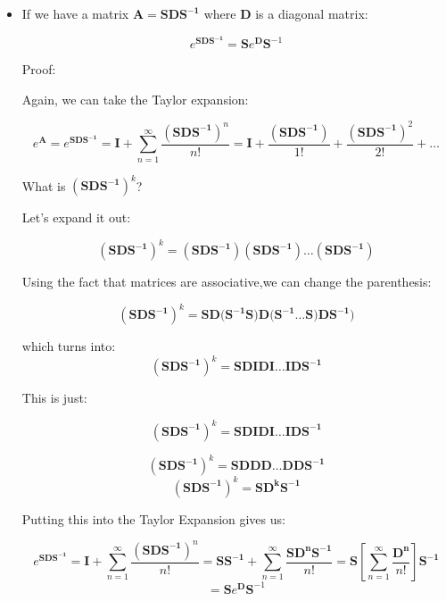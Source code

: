 \documentclass{report}
\begin{document}
{\begin{itemize}
    We see that each element on the diagonal is just the Taylor expansion of taking the exponent of the diagonal element. Thus we have:
    
    $$
    e^{\mathbf{D}} =
    \begin{bmatrix}
        e^{d_1} & & \\
        & \ddots & \\
        & & e^{d_k} \\
    \end{bmatrix}
    $$
    
    which is what we were trying to prove.
    
    
    
    
    \item If we have a matrix $\mathbf{A} = \mathbf{S}\mathbf{D}\mathbf{S^{-1}}$
    where $\mathbf{D}$ is a diagonal matrix:
    
    $$e^{\mathbf{\mathbf{S}\mathbf{D}\mathbf{S^{-1}}}} = \mathbf{S} e^{\mathbf{D}}\mathbf{S}^{-1}$$
    
    Proof:
    
    Again, we can take the Taylor expansion:
    
    $$e^{\mathbf{A}} = e^{\mathbf{SDS^{-1}}} = \mathbf{I} + \sum_{n=1}^\infty \frac{{(\mathbf{SDS^{-1}})}^n}{n!} = \mathbf{I} + \frac{(\mathbf{SDS^{-1}})}{1!} + \frac{(\mathbf{SDS^{-1}})^2}{2!} + \dots$$
    
    
    What is $(\mathbf{SDS^{-1}})^k$?
    
    Let's expand it out:
    
    $$(\mathbf{SDS^{-1}})^k = (\mathbf{SDS^{-1}})(\mathbf{SDS^{-1}})\dots(\mathbf{SDS^{-1}})$$
    
    Using the fact that matrices are associative,we can change the parenthesis:
    
    $$(\mathbf{SDS^{-1}})^k = \mathbf{SD(S^{-1}}\mathbf{S)D(S^{-1}}\dots\mathbf{S)DS^{-1}})$$
    
    which turns into:
        $$(\mathbf{SDS^{-1}})^k = \mathbf{SDIDI \dots IDS^{-1}}$$
        
    This is just:
        
    $$(\mathbf{SDS^{-1}})^k = \mathbf{SDIDI \dots IDS^{-1}}$$ 
        
    $$(\mathbf{SDS^{-1}})^k = \mathbf{SDDD \dots DDS^{-1}}$$ 
    $$(\mathbf{SDS^{-1}})^k = \mathbf{SD^kS^{-1}}$$ 
    
    Putting this into the Taylor Expansion gives us:
    
    
    $$e^{\mathbf{SDS^{-1}}} = \mathbf{I} + \sum_{n=1}^\infty \frac{{(\mathbf{SDS^{-1}})}^n}{n!} = \mathbf{SS^{-1}} + \sum_{n=1}^\infty \frac{{\mathbf{SD^nS^{-1}}}}{n!} = \mathbf{S}\left[\sum_{n=1}^\infty \frac{{\mathbf{D^n}}}{n!} \right]\mathbf{S^{-1}}$$
    $$= \mathbf{S} e^{\mathbf{D}}\mathbf{S}^{-1}$$
    

\end{itemize}}
\end{document}
